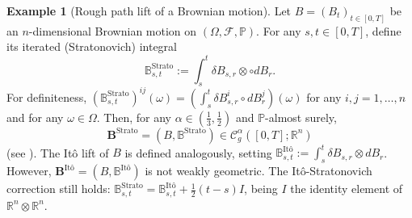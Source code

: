\documentclass[10pt, a4paper]{article} %
\newcommand{\R}{\mathbb{R}}
\theoremstyle{definition}
\newtheorem{ex}[defn]{Example}
\theoremstyle{plain}
\begin{document}
\begin{ex}[Rough path lift of a Brownian motion] \label{ex:liftofBrownianmotion}
     Let $B=(B_t)_{t \in [0,T]}$ be an $n$-dimensional Brownian motion on $(\Omega,\mathcal{F},\mathbb{P})$. 
     For any $s,t \in [0,T]$, define its iterated (Stratonovich) integral \begin{equation*}
         \mathbb{B}_{s,t}^{\text{Strato}} := \int_s^t \delta B_{s,r} \otimes \circ dB_r .
     \end{equation*}
     For definiteness, $(\mathbb{B}_{s,t}^{\text{Strato}})^{ij} (\omega) = (\int_s^t \delta B^i_{s,r} \circ dB^j_r)(\omega)$ for any $i,j=1,\dots,n$ and for any $\omega \in \Omega$. Then, for any $\alpha \in (\frac{1}{3},\frac{1}{2})$ and $\mathbb{P}$-almost surely, \begin{equation*}
         \mathbf{B}^{\text{Strato}} = (B,\mathbb{B}^{\text{Strato}}) \in \mathscr{C}^\alpha_g ([0,T];\R^n) 
     \end{equation*}
     (see \cite[Proposition 3.5]{FRIZHAIRER}). 
     The It\^o lift of $B$ is defined analogously, setting $\mathbb{B}_{s,t}^{\text{It\^o}}:= \int_s^t \delta B_{s,r} \otimes dB_r$. However, $\mathbf{B}^{\text{It\^o}} = (B,\mathbb{B}^{\text{It\^o}})$ is not weakly geometric. The It\^o-Stratonovich correction still holds: $\mathbb{B}_{s,t}^{\text{Strato}} = \mathbb{B}_{s,t}^{\text{It\^o}} + \frac{1}{2} (t-s) I$, being $I$ the identity element of $\R^n \otimes \R^n$. 
\end{ex}
\end{document}
